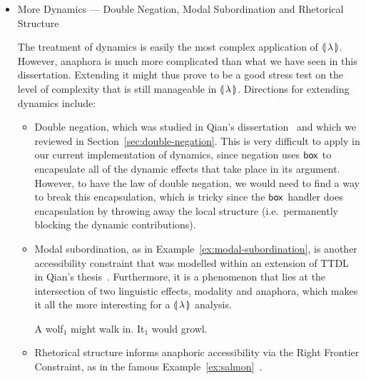 \begin{itemize}
  
\item More Dynamics --- Double Negation, Modal Subordination and Rhetorical
  Structure

  The treatment of dynamics is easily the most complex application of
  ${\llparenthesis \, \lambda \, \rrparenthesis}$. However, anaphora is much more complicated than what we have
  seen in this dissertation. Extending it might thus prove to be a good
  stress test on the level of complexity that is still manageable in
  ${\llparenthesis \, \lambda \, \rrparenthesis}$. Directions for extending dynamics include:

  \begin{itemize}
  \item Double negation, which was studied in Qian's
    dissertation~\cite{qian2014accessibility} and which we reviewed in
    Section~\ref{sec:double-negation}. This is very difficult to apply in
    our current implementation of dynamics, since negation uses $\mathsf{box}$ to
    encapsulate all of the dynamic effects that take place in its
    argument. However, to have the law of double negation, we would need to
    find a way to break this encapsulation, which is tricky since the
    $\mathsf{box}$ handler does encapsulation by throwing away the local structure
    (i.e.\ permanently blocking the dynamic contributions).

  \item Modal subordination, as in Example~\ref{ex:modal-subordination}, is
    another accessibility constraint that was modelled within an extension
    of TTDL in Qian's thesis~\cite{qian2014accessibility}. Furthermore, it
    is a phenomenon that lies at the intersection of two linguistic
    effects, modality and anaphora, which makes it all the more interesting
    for a ${\llparenthesis \, \lambda \, \rrparenthesis}$ analysis.

    \begin{exe}
      \ex A wolf$_1$ might walk in. It$_1$ would
      growl. \label{ex:modal-subordination}
    \end{exe}

  \item Rhetorical structure informs anaphoric accessibility via the Right
    Frontier Constraint, as in the famous
    Example~\ref{ex:salmon}~\cite{asher2003logics}.

    \begin{exe}
       \label{ex:salmon}
    \end{exe}
  \end{itemize}


\end{itemize}
